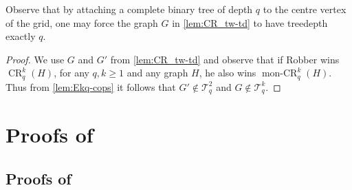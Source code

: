 \documentclass[10pt,a4paper]{article}
\newcommand{\Ekq}{\ensuremath{\mathcal{T}_{q}^{k}}}
\newcommand{\EParam}[2]{\ensuremath{\mathcal{T}_{#2}^{#1}}}
\DeclareMathOperator{\CR}{CR}
\DeclareMathOperator{\monCR}{mon-CR}
\begin{document}
Observe that by attaching a complete binary tree of depth $q$ to the centre vertex of the grid, one may force the graph $G$ in \cref{lem:CR_tw-td} to have treedepth exactly $q$.


\ekqtwtdsyntax*

\begin{proof}
	We use $G$ and $G'$ from \cref{lem:CR_tw-td} and observe that if Robber wins $\CR_q^k({H})$, for any $q,k\geq 1$ and any graph $H$, he also wins $\monCR_q^k(H)$.
	Thus from \cref{lem:Ekq-cops} it follows that $G'\notin\EParam{2}{q}$ and $G\notin\Ekq$.
\end{proof} 
\section{Proofs of }
\label{app:homind}
\subsection{Proofs of }
\label{app:c-homind}

\homcountsInCkq*
\end{document}
